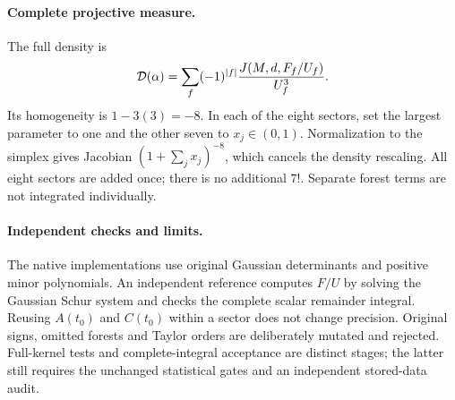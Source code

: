 \documentclass[11pt]{article}
\begin{document}
\paragraph{Complete projective measure.}
The full density is
\[
 {\cal D}(\alpha)=\sum_f(-1)^{|f|}
       \frac{J(M,d,F_f/U_f)}{U_f^3}.
\]
Its homogeneity is $1-3(3)=-8$. In each of the eight sectors, set the
largest parameter to one and the other seven to $x_j\in(0,1)$.
Normalization to the simplex gives Jacobian
$(1+\sum_jx_j)^{-8}$, which cancels the density rescaling.
All eight sectors are added once; there is no additional $7!$.
Separate forest terms are not integrated individually.

\paragraph{Independent checks and limits.}
The native implementations use original Gaussian determinants and
positive minor polynomials. An independent reference computes
$F/U$ by solving the Gaussian Schur system and checks the complete
scalar remainder integral. Reusing $A(t_0)$ and $C(t_0)$ within a sector
does not change precision. Original signs, omitted forests and Taylor
orders are deliberately mutated and rejected.
Full-kernel tests and complete-integral acceptance are distinct stages;
the latter still requires the unchanged statistical gates and an
independent stored-data audit.
\end{document}

